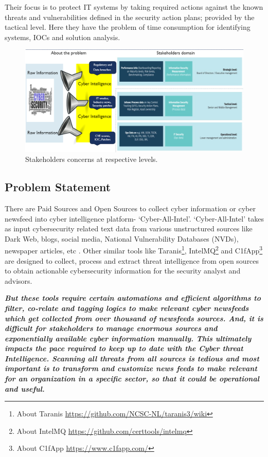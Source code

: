 Their focus is to protect IT systems 
by taking required actions against the known threats 
and vulnerabilities 
defined in the security action plans; provided by the tactical level. 
Here they have the problem of time consumption 
for identifying systems, IOCs and solution analysis.

\begin{figure}
\centering
    \includegraphics[scale=0.60]{Figures/stakeholder-problem.png}
    \caption{Stakeholders concerns at respective levels.}
    \label{fig:stakeholder-problem-domain}
\end{figure}


\subsection{Problem Statement}

There are Paid Sources and Open Sources to collect cyber information or cyber newsfeed into cyber intelligence platform- ‘Cyber-All-Intel’. ‘Cyber-All-Intel’ takes as input cybersecurity related text data from various unstructured sources like Dark Web, blogs, social media, National Vulnerability Databases (NVDs), newspaper articles, etc \citep{mittal2019cyber}. Other similar tools like 
Taranis\footnote{About Taranis \url{https://github.com/NCSC-NL/taranis3/wiki}}, 
IntelMQ\footnote{About IntelMQ \url{https://github.com/certtools/intelmq}}
and 
C1fApp\footnote{About C1fApp \url{https://www.c1fapp.com/}} 
are designed to collect, process and extract threat intelligence from open sources to obtain actionable cybersecurity information for the security analyst and advisors. 

\bigbreak

\textit{\textbf{But these tools require certain automations and efficient algorithms to filter, co-relate and tagging logics to make relevant cyber newsfeeds which get collected from over thousand of newsfeeds sources. 
And, it is difficult for stakeholders to manage enormous sources and exponentially available cyber information manually. 
This ultimately impacts the pace required to keep up to date with the Cyber threat Intelligence. 
Scanning all threats from all sources is tedious 
\citep{ghazi2018supervised} and most important is to transform and customize news feeds to make relevant for an organization in a specific sector, so that it could be operational and useful.
}
}

